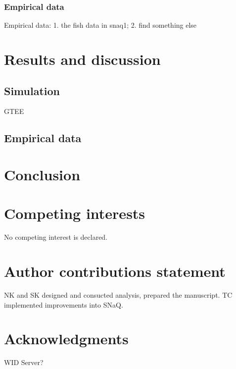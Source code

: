 \documentclass[unnumsec,webpdf,contemporary,large]{oup-authoring-template}%
\theoremstyle{thmstyleone}%
\theoremstyle{thmstyletwo}%
\theoremstyle{thmstylethree}%
\begin{document}

\subsubsection{Empirical data}

Empirical data: 1. the fish data in snaq1; 2. find something else

\section{Results and discussion}\label{sec3}
\subsection{Simulation}\label{subsec4}
GTEE
\subsection{Empirical data}\label{subsec5}

\section{Conclusion}\label{sec4}

\section{Competing interests}
No competing interest is declared.

\section{Author contributions statement}
NK and SK designed and consucted analysis, prepared the manuscript. TC implemented improvements into SNaQ. 

\section{Acknowledgments}
WID Server? 

%
%


\end{document}
